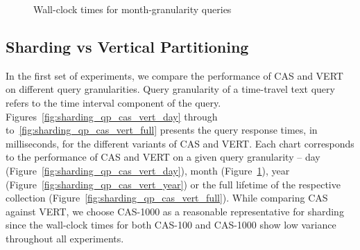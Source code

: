 \begin{figure}[tb]
  	\centering
	  \quad
   	\caption{Wall-clock times for month-granularity queries}
\label{fig:sharding_qp_cas_vert_month}
\end{figure}


\subsection{Sharding vs Vertical Partitioning}

In the first set of experiments, we compare the performance of
CAS and VERT on different query granularities. Query granularity of a time-travel text query refers to the time interval component of the query. Figures~\ref{fig:sharding_qp_cas_vert_day} through to~\ref{fig:sharding_qp_cas_vert_full} presents the query response times, in milliseconds, for the different variants of CAS and VERT. Each chart corresponds to the performance of CAS and VERT on a given query granularity -- day (Figure~\ref{fig:sharding_qp_cas_vert_day}), month (Figure~\ref{fig:sharding_qp_cas_vert_month}), year (Figure~\ref{fig:sharding_qp_cas_vert_year}) or the full lifetime of the respective collection (Figure~\ref{fig:sharding_qp_cas_vert_full}). While comparing CAS against VERT, we choose CAS-1000 as a reasonable representative for sharding since the wall-clock times for both CAS-100 and CAS-1000 show low variance throughout all experiments.

